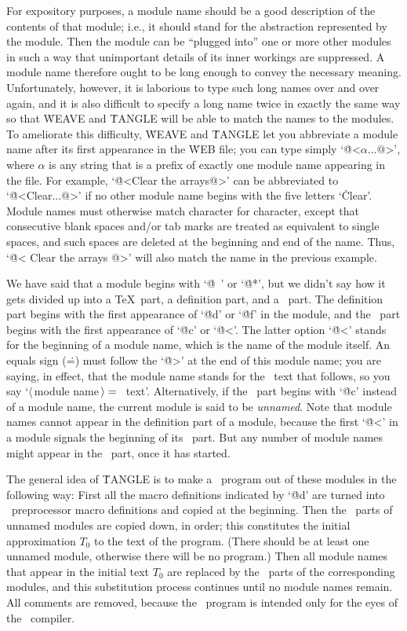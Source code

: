 For expository purposes, a module name should be a good description of the
contents of that module; i.e., it should stand for the abstraction
represented by the module. Then the module can be ``plugged into'' one or
more other modules in such a way
that unimportant details of its inner workings
are suppressed.  A module name therefore ought to be long enough to convey
the necessary meaning. Unfortunately, however, it is laborious to type
such long names over and over again, and it is also difficult to specify a
long name twice in exactly the same way so that \.{WEAVE} and \.{TANGLE}
will be able to match the names to the modules. To ameliorate this difficulty,
\.{WEAVE} and \.{TANGLE} let you abbreviate a module name
after its first appearance in the \.{WEB} file; you can type simply
`\.{@<$\alpha$...@>}', where $\alpha$ is any string that is a prefix of
exactly one module name appearing in the file. For example, `\.{@<Clear
the arrays@>}' can be abbreviated to `\.{@<Clear...@>}' if no other module
name begins with the five letters `\.{Clear}'. Module names must otherwise
match character for character, except that consecutive blank spaces and/or
tab marks are treated as equivalent to single spaces, and such spaces are
deleted at the beginning and end of the name. Thus, `\.{@< Clear { }the
arrays @>}' will also match the name in the previous example.

We have said that a module begins with `\.{@\ }' or `\.{@*}', but we
didn't say how it gets divided up into a \TeX\ part, a definition part,
and a \Cee\ part. The definition part begins with the first appearance
of `\.{@d}' or `\.{@f}' in the module, and the \Cee\ part begins with
the first appearance of `\.{@c}' or `\.{@<}'. The latter option `\.{@<}'
stands for the beginning of a module name, which is the name of the module
itself. An equals sign (\.=) must follow the `\.{@>}' at the end of this
module name; you are saying, in effect, that the module name stands for
the \Cee\ text that follows, so you say `$\langle\,$module
name$\,\rangle=\null$\Cee\ text'. Alternatively, if the \Cee\ part
begins with `\.{@c}' instead of a module name, the current module is said
to be {\sl unnamed}. Note that module names cannot appear in the
definition part of a module, because the first `\.{@<}' in a module
signals the beginning of its \Cee\ part.  But any number of module names
might appear in the \Cee\ part, once it has started.

The general idea of \.{TANGLE} is to make a \Cee\ program out of these
modules in the following way: First all the macro definitions
indicated by `\.{@d}' are turned into \Cee\ preprocessor macro definitions
and copied at the beginning.
Then the \Cee\ parts of unnamed modules are copied down,
in order; this constitutes the initial
approximation $T_0$ to the text of the program. (There should be at least
one unnamed module, otherwise there will be no program.) Then all module
names that appear in the initial text $T_0$ are replaced by the \Cee\
parts of the corresponding modules, and this substitution process
continues until no module names remain. All comments are removed, because
the \Cee\ program is intended only for the eyes of the \Cee\ compiler.

